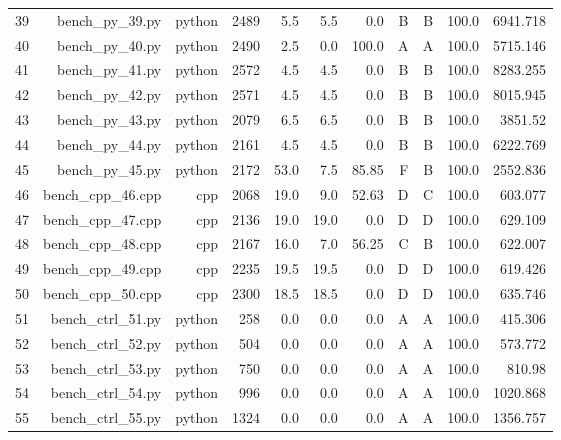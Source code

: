 \begin{table}[htbp]
\begin{tabular}{lrrrrrrrrrr}
39 & bench\_py\_39.py & python & 2489 & 5.5 & 5.5 & 0.0 & B & B & 100.0 & 6941.718 \\
40 & bench\_py\_40.py & python & 2490 & 2.5 & 0.0 & 100.0 & A & A & 100.0 & 5715.146 \\
41 & bench\_py\_41.py & python & 2572 & 4.5 & 4.5 & 0.0 & B & B & 100.0 & 8283.255 \\
42 & bench\_py\_42.py & python & 2571 & 4.5 & 4.5 & 0.0 & B & B & 100.0 & 8015.945 \\
43 & bench\_py\_43.py & python & 2079 & 6.5 & 6.5 & 0.0 & B & B & 100.0 & 3851.52 \\
44 & bench\_py\_44.py & python & 2161 & 4.5 & 4.5 & 0.0 & B & B & 100.0 & 6222.769 \\
45 & bench\_py\_45.py & python & 2172 & 53.0 & 7.5 & 85.85 & F & B & 100.0 & 2552.836 \\
46 & bench\_cpp\_46.cpp & cpp & 2068 & 19.0 & 9.0 & 52.63 & D & C & 100.0 & 603.077 \\
47 & bench\_cpp\_47.cpp & cpp & 2136 & 19.0 & 19.0 & 0.0 & D & D & 100.0 & 629.109 \\
48 & bench\_cpp\_48.cpp & cpp & 2167 & 16.0 & 7.0 & 56.25 & C & B & 100.0 & 622.007 \\
49 & bench\_cpp\_49.cpp & cpp & 2235 & 19.5 & 19.5 & 0.0 & D & D & 100.0 & 619.426 \\
50 & bench\_cpp\_50.cpp & cpp & 2300 & 18.5 & 18.5 & 0.0 & D & D & 100.0 & 635.746 \\
51 & bench\_ctrl\_51.py & python & 258 & 0.0 & 0.0 & 0.0 & A & A & 100.0 & 415.306 \\
52 & bench\_ctrl\_52.py & python & 504 & 0.0 & 0.0 & 0.0 & A & A & 100.0 & 573.772 \\
53 & bench\_ctrl\_53.py & python & 750 & 0.0 & 0.0 & 0.0 & A & A & 100.0 & 810.98 \\
54 & bench\_ctrl\_54.py & python & 996 & 0.0 & 0.0 & 0.0 & A & A & 100.0 & 1020.868 \\
55 & bench\_ctrl\_55.py & python & 1324 & 0.0 & 0.0 & 0.0 & A & A & 100.0 & 1356.757 \\
\hline
\end{tabular}
\end{table}